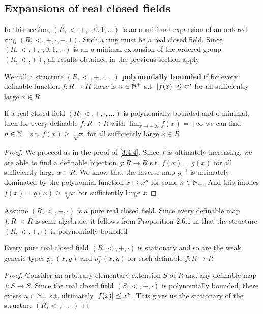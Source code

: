 \documentclass[11pt]{article}
\begin{document}
\subsection{Expansions of real closed fields}
\label{sec:org003440f}
In this section, \((R,<,+,\cdot,0,1,\dots)\) is an o-minimal expansion of an ordered
ring \((R,<,+,\cdot,-,1)\). Such a ring must be a real closed field. Since \((R,<,+,\cdot,0,1,\dots)\) is an
o-minimal expansion of the ordered group \((R,<,+)\), all results obtained in the previous
section apply

\begin{definition}[]
We call a structure \((R,<,+,\cdot,\dots)\) \textbf{polynomially bounded} if for every definable
function \(f:R\to R\) there is \(n\in\mathbb{N}^+\) s.t. \(\abs{f(x)}\le x^n\) for all sufficiently large \(x\in R\)
\end{definition}

\begin{remark}
\label{3.5.2}
If a real closed field \((R,<,+,\cdot,\dots)\) is polynomially bounded and o-minimal, then for every
definable \(f:R\to R\) with \(\lim_{x\to+\infty}f(x)=+\infty\) we can find \(n\in\mathbb{N}_+\) s.t. \(f(x)\ge\sqrt[n]{x}\)
for all sufficiently large \(x\in R\)
\end{remark}

\begin{proof}
We proceed as in the proof of \ref{3.4.4}. Since \(f\) is ultimately increasing, we are able to
find a definable bijection \(g:R\to R\) s.t. \(f(x)=g(x)\) for all sufficiently large \(x\in R\). We
know that the inverse map \(g^{-1}\) is ultimately dominated by the polynomial
function \(x\mapsto x^n\) for some \(n\in\mathbb{N}_+\). And this implies \(f(x)=g(x)\ge\sqrt[n]{x}\) for
sufficiently large \(x\)
\end{proof}

Assume \((R,<,+,\cdot)\) is a pure real closed field. Since every definable map \(f:R\to R\) is
semi-algebraic, it follows from Proposition 2.6.1 in \cite{bochnak2013real} that the
structure \((R,<,+,\cdot)\) is polynomially bounded

\begin{corollary}[]
Every pure real closed field \((R,<,+,\cdot)\) is stationary and so are the weak generic
types \(p_f^-(x,y)\) and \(p_f^+(x,y)\) for each definable \(f:R\to R\)
\end{corollary}

\begin{proof}
Consider an arbitrary elementary extension \(S\) of \(R\) and any definable map \(f:S\to S\).
Since the real closed field \((S,<,+,\cdot)\) is polynomially bounded, there exists \(n\in\mathbb{N}_+\) s.t.
ultimately \(\abs{f(x)}\le x^n\). This gives us the stationary of the structure \((R,<,+,\cdot)\)
\end{proof}
\end{document}
